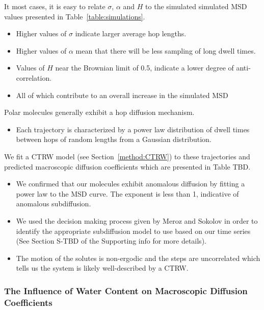 \documentclass{article}
\begin{document}
  It most cases, it is easy to relate $\sigma$, $\alpha$ and $H$ to the simulated
  simulated MSD values presented in Table~\ref{table:simulations}. 
  \begin{itemize}
  	\item Higher values of $\sigma$ indicate larger average hop lengths.
  	\item Higher values of $\alpha$ mean that there will be less sampling of 
  	long dwell times.
  	\item Values of $H$ near the Brownian limit of 0.5, indicate a lower degree
  	of anti-correlation.
  	\item All of which contribute to an overall increase in the simulated MSD
  \end{itemize}
  
  Polar molecules generally exhibit a hop diffusion mechanism. 
  \begin{itemize}
	\item Each trajectory is characterized by a power law distribution of
	dwell times between hops of random lengths from a Gaussian distribution.
  \end{itemize}


  We fit a CTRW model (see Section~\ref{method:CTRW}) to these 
  trajectories and predicted macroscopic diffusion coefficients which are
  presented in Table TBD.
  \begin{itemize}
	\item We confirmed that our molecules exhibit anomalous diffusion
	by fitting a power law to the MSD curve. The exponent is less than
	1, indicative of anomalous subdiffusion.
	\item We used the decision making process given by Meroz and Sokolov
	in order to identify the appropriate subdiffusion model to use 
	based on our time series (See Section S-TBD of the Supporting info for
	more details).
	\item The motion of the solutes is non-ergodic and the steps are
	uncorrelated which tells us the system is likely well-described
	by a CTRW. 
  \end{itemize}


  \subsubsection*{The Influence of Water Content on Macroscopic Diffusion Coefficients}
\end{document}

